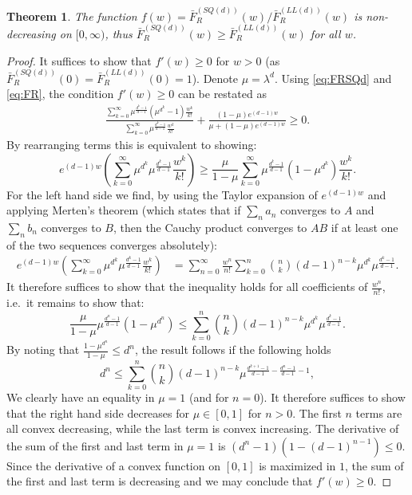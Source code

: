\documentclass[12pt]{report}
\newtheorem{theorem}{Theorem}
\begin{document}
\begin{theorem}
The function $f(w) = \bar{F}_R^{(SQ(d))}(w)/\bar{F}_R^{(LL(d))}(w)$ is non-decreasing on $[0,\infty)$, thus
$\bar{F}_R^{(SQ(d))}(w) \geq \bar{F}_R^{(LL(d))}(w)$ for all $w$.
\end{theorem}
\begin{proof}
It suffices to show that $f'(w) \geq 0$ for $w>0$ (as $\bar{F}_R^{(SQ(d))}(0) =\bar{F}_R^{(LL(d))}(0) = 1$).
Denote $\mu = \lambda^d$. Using \eqref{eq:FRSQd} and \eqref{eq:FR}, the condition $f'(w) \geq 0$ can be restated as
\begin{align*}
\frac{\sum_{k=0}^\infty \mu^{\frac{d^k-1}{d-1}} (\mu^{d^k}-1)\frac{w^k}{k!}}{\sum_{k=0}^\infty \mu^{\frac{d^k-1}{d-1}}\frac{w^k}{k!}} + \frac{(1-\mu) e^{(d-1) w}}{\mu + (1-\mu) e^{(d-1)w}} \geq 0.
\end{align*}
By rearranging terms this is equivalent to showing:
$$
e^{(d-1)w} \left( \sum_{k=0}^\infty \mu^{d^k} \mu^{{\frac{d^k-1}{d-1}}} \frac{w^k}{k!} \right) \geq \frac{\mu}{1-\mu} \sum_{k=0}^\infty \mu^{\frac{d^k-1}{d-1}} (1-\mu^{d^k}) \frac{w^k}{k!}.
$$
For the left hand side we find, by using the Taylor expansion of $e^{(d-1)w}$ and applying Merten's theorem
(which states that if $\sum_n a_n$ converges to $A$ and $\sum_n b_n$ converges to $B$, then
the Cauchy product converges to $AB$ if at least one of the two sequences converges absolutely):
\begin{align*}
e^{(d-1)w} \left( \sum_{k=0}^\infty \mu^{d^k} \mu^{{\frac{d^k-1}{d-1}}} \frac{w^k}{k!} \right)
&= \sum_{n=0}^\infty \frac{w^n}{n!} \sum_{k=0}^n \binom{n}{k} (d-1)^{n-k} \mu^{d^k} \mu^{\frac{d^k-1}{d-1}}.
\end{align*}
It therefore suffices to show that the inequality holds for all coefficients of $\frac{w^n}{n!}$, i.e.~it remains to show that:
$$
\frac{\mu}{1-\mu} \mu^{\frac{d^n-1}{d-1}} (1-\mu^{d^n}) \leq \sum_{k=0}^n \binom{n}{k} (d-1)^{n-k} \mu^{d^k} \mu^{\frac{d^k-1}{d-1}}.
$$
By noting that $\frac{1-\mu^{d^n}}{1-\mu} \leq d^n$, the result follows if the following holds
$$
d^n \leq \sum_{k=0}^n \binom{n}{k} (d-1)^{n-k} \mu^{\frac{d^{k+1}-1}{d-1} - \frac{d^{n}-1}{d-1} - 1},
$$
We clearly have an equality in $\mu = 1$ (and for $n=0$). It therefore suffices to show that the right hand side decreases for $\mu \in [0,1]$
for $n > 0$. The first $n$ terms are all 
convex decreasing, while the last term is convex increasing. The derivative of the sum of the first and last term in $\mu = 1$ is $(d^n-1)(1-(d-1)^{n-1}) \leq 0$.
Since the derivative of a convex function on $[0,1]$ is maximized in $1$, the sum of the first and last term is decreasing and 
we may conclude that $f'(w) \geq 0$.
\end{proof}
\end{document}

